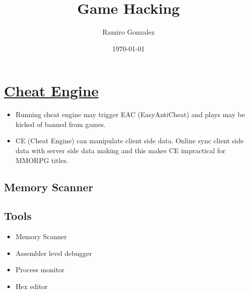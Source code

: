 \documentclass[12pt]{article}
\begin{document}
\title{ Game  Hacking}
\author{Ramiro Gonzalez}
\date{\today}

\maketitle
\section{\href{https://www.cheatengine.org/}{\color{blue} Cheat Engine\color{black}}}
\begin{itemize}
    \item Running cheat engine may trigger EAC (EasyAntiCheat) and plays may be kicked of banned from games.
    \item CE (Cheat Engine) can manipulate client side data. Online sync client side data with server side data making and this makes CE impractical for MMORPG titles. 
\end{itemize}

\subsection{Memory Scanner} 

\subsection{Tools}
\begin{itemize}
    \item Memory Scanner 
    \item Assembler level debugger
    \item Process monitor 
    \item Hex editor
\end{itemize}
\end{document}
